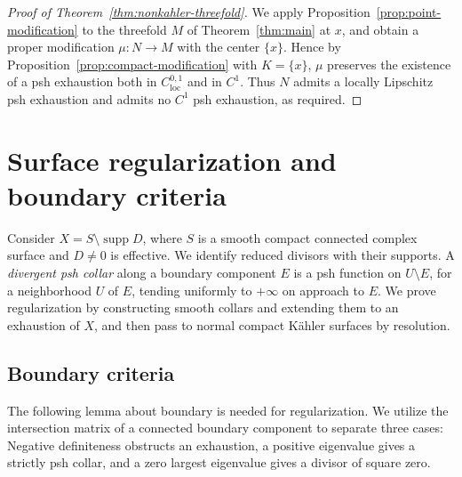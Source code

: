 \documentclass[11pt]{amsart}
\theoremstyle{definition}
\theoremstyle{remark}
\numberwithin{equation}{section}
\newcommand{\supp}{\operatorname{supp}}
\begin{document}
\begin{proof}[Proof of Theorem~\ref{thm:nonkahler-threefold}]
We apply Proposition~\ref{prop:point-modification} to the threefold $M$
of Theorem~\ref{thm:main} at $x$, and obtain a proper modification $\mu:N\to M$ with the center $\{x\}$.
Hence by Proposition~\ref{prop:compact-modification} with $K=\{x\}$,
$\mu$ preserves the existence of a psh exhaustion both in
$C^{0,1}_{\mathrm{loc}}$ and in $C^1$. Thus $N$ admits a locally
Lipschitz psh exhaustion and admits no $C^1$ psh exhaustion,
as required.
\end{proof}

\section{Surface regularization and boundary criteria}\label{sec:surfaces}
Consider $X=S\setminus\supp D$, where
$S$ is a smooth compact connected complex surface and $D\ne0$ is
effective. We identify reduced divisors with their supports.
A \emph{divergent psh collar} along a boundary component $E$ is a
psh function on $U\setminus E$, for a neighborhood $U$ of $E$,
tending uniformly to $+\infty$ on approach to $E$.
We prove regularization by constructing smooth collars and extending
them to an exhaustion of $X$, and then pass to
normal compact K\"ahler surfaces by resolution.

\subsection{Boundary criteria}\label{sec:surface-pair-reduction}

The following lemma about boundary is needed for regularization. We utilize the intersection matrix of a connected boundary component to separate three cases:
Negative definiteness obstructs an exhaustion, a positive eigenvalue
gives a strictly psh collar, and a zero largest eigenvalue gives a
divisor of square zero.
\end{document}
